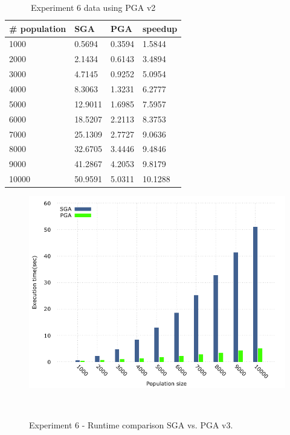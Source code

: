 \begin{table}[H]
\centering
\caption{Experiment 6 data using PGA v2}
\label{tab:pga3_pop}
\begin{tabular}{|l|l|l|l|}
\hline
\# population & SGA     & PGA    & speedup \\ \hline
1000          & 0.5694  & 0.3594 & 1.5844  \\ \hline
2000          & 2.1434  & 0.6143 & 3.4894  \\ \hline
3000          & 4.7145  & 0.9252 & 5.0954  \\ \hline
4000          & 8.3063  & 1.3231 & 6.2777  \\ \hline
5000          & 12.9011 & 1.6985 & 7.5957  \\ \hline
6000          & 18.5207 & 2.2113 & 8.3753  \\ \hline
7000          & 25.1309 & 2.7727 & 9.0636  \\ \hline
8000          & 32.6705 & 3.4446 & 9.4846  \\ \hline
9000          & 41.2867 & 4.2053 & 9.8179  \\ \hline
10000         & 50.9591 & 5.0311 & 10.1288 \\ \hline
\end{tabular}
\end{table}

\begin{figure}[H]
\begin{center}
  \includegraphics[width=.7 \linewidth]{stats_data_new/graphs/pga_partial_xPop_hist.png}
  \caption{Experiment 6 - Runtime comparison SGA vs. PGA v3.}
  \end{center}\
\end{figure}

